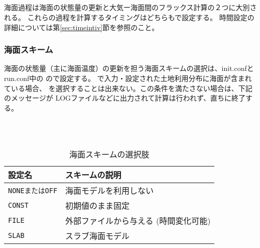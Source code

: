 \subsection{\SubsecOceanSetting} \label{subsecp:basic_usel_ocean}
海面過程は海面の状態量の更新と大気ー海面間のフラックス計算の２つに大別される。
これらの過程を計算するタイミングはどちらもで設定する。
時間設定の詳細については第\ref{sec:timeintiv}節を参照のこと。\\


\subsubsection{海面スキーム}
海面の状態量（主に海面温度）の更新を担う海面スキームの選択は、init.confとrun.conf中の
ので設定する。
で入力・設定された土地利用分布に海面が含まれている場合、
を選択することは出来ない。この条件を満たさない場合は、下記のメッセージが
LOGファイルなどに出力されて計算は行われず、直ちに終了する。

\\

\\

\begin{table}[h]
\begin{center}
  \caption{海面スキームの選択肢}
  \label{tab:nml_ocean}
  \begin{tabularx}{150mm}{lX} \hline
    \rowcolor[gray]{0.9}  設定名 & スキームの説明 \\ \hline
      \verb|NONEまたはOFF| & 海面モデルを利用しない              \\
      \verb|CONST|        & 初期値のまま固定                   \\
      \verb|FILE|         & 外部ファイルから与える (時間変化可能) \\
      \verb|SLAB|         & スラブ海面モデル                   \\
    \hline
  \end{tabularx}
\end{center}
\end{table}

